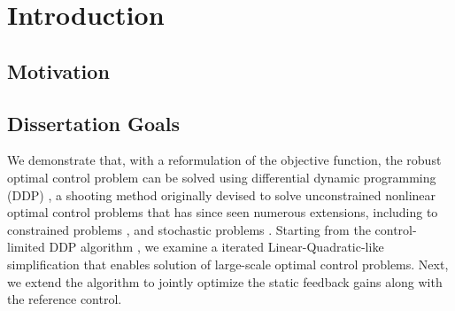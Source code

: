 \chapter{Introduction}
%
%
\section{Motivation}

\section{Dissertation Goals}






We demonstrate that, with a reformulation of the objective function, the robust optimal control problem can be solved using differential dynamic programming (DDP) \cite{DDP}, a shooting method originally devised to solve unconstrained nonlinear optimal control problems that has since seen numerous extensions, including to constrained problems \cite{DDP_ControlLimited,HDDP1,HDDP2,DDP_NonlinearConstraints,DDP_InteriorPoint}, and stochastic problems \cite{iLQG, DDP_Stochastic, ozaki_UT,ozaki2020tube}. 
Starting from the control-limited DDP algorithm \cite{DDP_ControlLimited}, we examine a iterated Linear-Quadratic-like simplification \cite{iLQG} that enables solution of large-scale optimal control problems. Next, we extend the algorithm to jointly optimize the static feedback gains along with the reference control.


